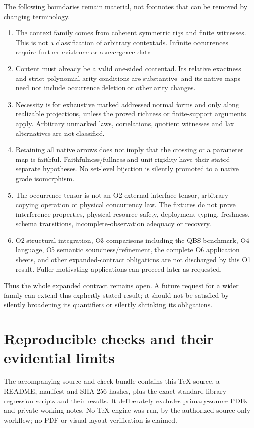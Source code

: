 \documentclass[11pt,a4paper]{article}
\theoremstyle{definition}
\begin{document}
The following boundaries remain material, not footnotes that can be removed
by changing terminology.
\begin{enumerate}
\item The context family comes from coherent symmetric rigs and finite
witnesses. This is not a classification of arbitrary contextads. Infinite
occurrences require further existence or convergence data.
\item Content must already be a valid one-sided contentad. Its relative
exactness and strict polynomial arity conditions are substantive, and its
native maps need not include occurrence deletion or other arity changes.
\item Necessity is for exhaustive marked addressed normal forms and only
along realizable projections, unless the proved richness or finite-support
arguments apply. Arbitrary unmarked laws, correlations, quotient witnesses and
lax alternatives are not classified.
\item Retaining all native arrows does not imply that the crossing or a
parameter map is faithful. Faithfulness/fullness and unit rigidity have their
stated separate hypotheses. No set-level bijection is silently promoted to a
native grade isomorphism.
\item The occurrence tensor is not an O2 external interface tensor, arbitrary
copying operation or physical concurrency law. The fixtures do not prove
interference properties, physical resource safety, deployment typing,
freshness, schema transitions, incomplete-observation adequacy or recovery.
\item O2 structural integration, O3 comparisons including the QBS benchmark,
O4 language, O5 semantic soundness/refinement, the complete O6 application
sheets, and other expanded-contract obligations are not discharged by this
O1 result. Fuller motivating applications can proceed later as requested.
\end{enumerate}
Thus the whole expanded contract remains open. A future request for a wider
family can extend this explicitly stated result; it should not be satisfied
by silently broadening its quantifiers or silently shrinking its obligations.

\appendix
\section{Reproducible checks and their evidential limits}\label{app:checks}
The accompanying source-and-check bundle contains this TeX source, a README,
manifest and SHA-256 hashes, plus the exact standard-library regression scripts
and their results. It deliberately excludes primary-source PDFs and private
working notes. No TeX engine was run, by the authorized source-only workflow;
no PDF or visual-layout verification is claimed.
\end{document}
